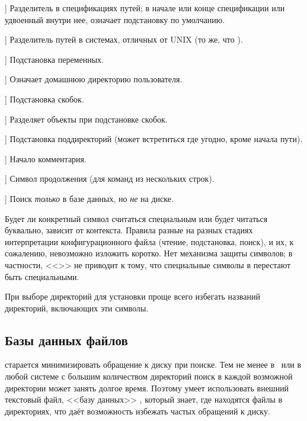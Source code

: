 \documentclass{article}
\renewcommand{\samp}[1]{<<\texttt{#1}>>}
\begin{document}
\newcommand{\CODE}[1]{\makebox[3em][l]{\code{#1}}}
\begin{ttdescription}
\item[\CODE{:}] Разделитель в спецификациях путей; в начале или конце
  спецификации или удвоенный внутри нее, означает подстановку по
  умолчанию.
\item[\CODE{;}] Разделитель путей в системах, отличных от UNIX (то
  же, что \code{:}).
\item[\CODE{\$}] Подстановка переменных.
\item[\CODE{\string~}] Означает домашнюю директорию пользователя.
\item[\CODE{\char`\{...\char`\}}] Подстановка скобок.
\item[\CODE{,}] Разделяет объекты при подстановке скобок.
\item[\CODE{//}] Подстановка поддиректорий (может встретиться где
  угодно, кроме начала пути).
\item[\CODE{\%}] Начало комментария.
\item[\CODE{\bs}] Символ продолжения (для команд из нескольких строк).
\item[\CODE{!!}] Поиск  \emph{только} в базе данных, но \emph{не} на
  диске. 
\end{ttdescription}

Будет ли конкретный символ считаться специальным или будет читаться
буквально, зависит от контекста.  Правила разные на разных стадиях
интерпретации конфигурационного файла (чтение, подстановка, поиск), и
их, к сожалению, невозможно изложить коротко.  Нет механизма защиты
символов; в частности, \samp{\bs} не приводит к тому, что специальные
символы в  перестают быть специальными.  

При выборе директорий для установки проще всего избегать названий
директорий, включающих эти символы.

\subsection{Базы данных файлов}
\label{sec:filename-database}

\KPS{} старается минимизировать обращение к диску при поиске.  Тем не
менее в \TL\ или в любой системе с большим количеством директорий поиск в каждой
возможной директории может занять долгое время. Поэтому  \KPS{}
умеет использовать внешний текстовый файл, 
<<базу данных>>  , который знает, где находятся файлы в
директориях, что даёт возможность избежать частых обращений к диску. 
\end{document}

